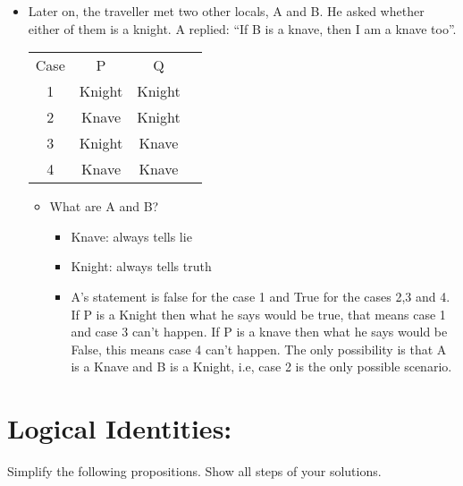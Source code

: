 \documentclass[11pt]{article}
\begin{document}
 
 
 
 \begin{itemize}
\item Later on, the traveller met two other locals, A and B. He asked whether either of them is a knight.
A replied: “If B is a knave, then I am a knave too”.

\begin{center}
\begin{tabular}{ |c|c|c|c| } 
 \hline
Case & P & Q \\ 
1 & Knight & Knight \\ 
2 & Knave & Knight \\ 
3 & Knight & Knave \\
4 & Knave & Knave \\
 \hline
\end{tabular}
\end{center}

\begin{itemize}
\item What are A and B?
 \begin{itemize}
\item Knave: always tells lie
\item Knight: always tells truth 
\item A's statement is false for the case 1 and True for the cases 2,3 and 4. If P is a Knight then what he says would be true, that means case 1 and case 3 can't happen. If P is a knave then what he says would be False, this means case 4 can't happen. The only possibility is that A is a Knave and B is a Knight, i.e, case 2 is the only possible scenario.
\end{itemize}
\end{itemize}
\end{itemize}

 



\section{Logical Identities: }

Simplify the following propositions. Show all steps of your solutions.
\end{document}
